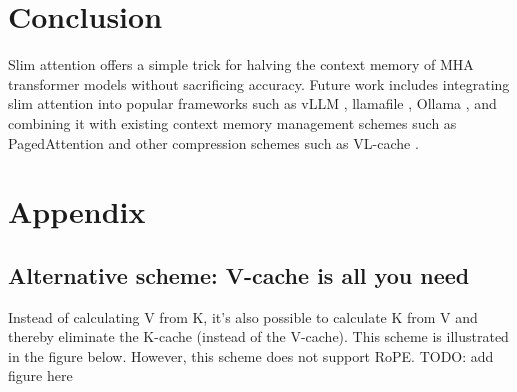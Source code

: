 \documentclass{article}
\begin{document}



\section{Conclusion}
Slim attention offers a simple trick for halving the context memory of MHA transformer models without sacrificing accuracy. Future work includes integrating slim attention into popular frameworks such as vLLM \citep{vLLM}, llamafile \citep{llamafile}, Ollama \citep{ollama}, and combining it with existing context memory management schemes such as PagedAttention \citep{pagedAttn} and other compression schemes such as VL-cache \citep{VL-cache}.





\section*{Appendix}

\subsection*{Alternative scheme: V-cache is all you need}
Instead of calculating V from K, it's also possible to calculate K from V and thereby eliminate the K-cache (instead of the V-cache). This scheme is illustrated in the figure below. However, this scheme does not support RoPE.
TODO: add figure here
\end{document}
